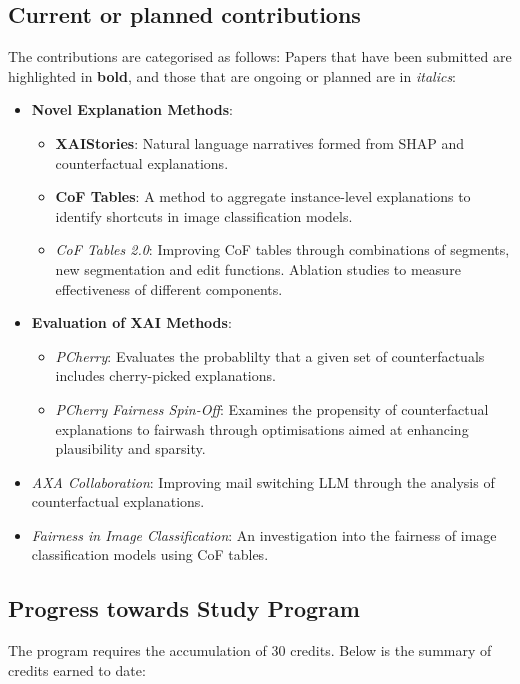 \subsection*{Current or planned contributions}
The contributions are categorised as follows: Papers that have been submitted are highlighted 
in \textbf{bold}, and those that are ongoing or planned are in \textit{italics}:
\begin{itemize}
    \item \textbf{Novel Explanation Methods}:
    \begin{itemize}
        \item \textbf{XAIStories}: Natural language narratives formed from SHAP and counterfactual explanations.
        \item \textbf{CoF Tables}: A method to aggregate instance-level explanations to identify shortcuts in 
        image classification models.
        \item \textit{CoF Tables 2.0}: Improving CoF tables through combinations of segments, 
        new segmentation and edit functions. Ablation studies to measure effectiveness of different components.
    \end{itemize}
    \item \textbf{Evaluation of XAI Methods}:
    \begin{itemize}
        \item \textit{PCherry}: Evaluates the probablilty that a given set of counterfactuals includes 
        cherry-picked explanations.
        \item \textit{PCherry Fairness Spin-Off}: Examines the propensity of counterfactual explanations to 
        fairwash through optimisations aimed at enhancing plausibility and sparsity.
    \end{itemize}
    \item \textit{AXA Collaboration}: Improving mail switching LLM through the analysis of counterfactual explanations.
    \item \textit{Fairness in Image Classification}: An investigation into the fairness of image classification 
    models using CoF tables.
\end{itemize}

\subsection*{Progress towards Study Program}
The program requires the accumulation of 30 credits. Below is the summary of credits earned to date:

